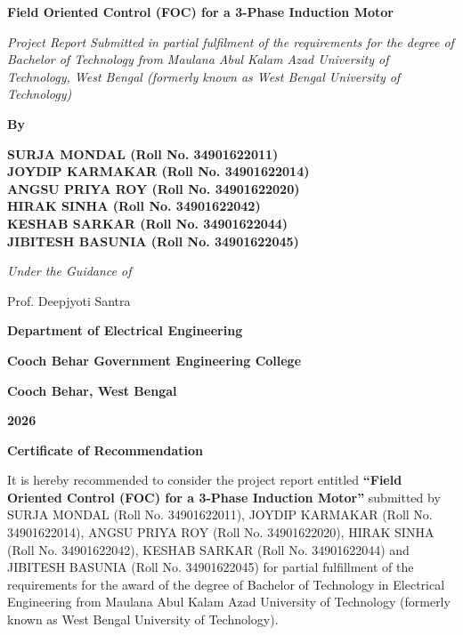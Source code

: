 \documentclass[12pt,a4paper]{report}
\begin{document}
\begin{titlepage}
\begin{center}
{\fontsize{28}{34}\selectfont\bfseries Field Oriented Control (FOC) for a 3-Phase Induction Motor\par}
\vspace{1.5cm}
{\fontsize{14}{17}\selectfont \textit{Project Report Submitted in partial fulfilment of the requirements for the degree of Bachelor of Technology from Maulana Abul Kalam Azad University of Technology, West Bengal (formerly known as West Bengal University of Technology)}\par}
\vspace{1.5cm}
{\Large \bfseries By\par}
\vspace{0.5cm}
{\fontsize{18}{22}\selectfont\bfseries
SURJA MONDAL (Roll No. 34901622011)\\
JOYDIP KARMAKAR (Roll No. 34901622014)\\
ANGSU PRIYA ROY (Roll No. 34901622020)\\
HIRAK SINHA (Roll No. 34901622042)\\
KESHAB SARKAR (Roll No. 34901622044)\\
JIBITESH BASUNIA (Roll No. 34901622045)\par}


\vspace{1.5cm}
{\fontsize{16}{19}\selectfont \textit{Under the Guidance of}\par}
\vspace{0.5cm}
{\fontsize{16}{19}\selectfont Prof. Deepjyoti Santra\par}
\vfill
{\Large \textbf{Department of Electrical Engineering}\par}
{\Large \textbf{Cooch Behar Government Engineering College}\par}
{\Large \textbf{Cooch Behar, West Bengal}\par}
{\Large \textbf{2026}\par}
\end{center}
\end{titlepage}

\newpage
\begin{center}
{\Large \bfseries Certificate of Recommendation\par}
\end{center}
\vspace{1cm}
It is hereby recommended to consider the project report entitled \textbf{``Field Oriented Control (FOC) for a 3-Phase Induction Motor''} submitted by SURJA MONDAL (Roll No. 34901622011), JOYDIP KARMAKAR (Roll No. 34901622014), ANGSU PRIYA ROY (Roll No. 34901622020), HIRAK SINHA (Roll No. 34901622042), KESHAB SARKAR (Roll No. 34901622044) and JIBITESH BASUNIA (Roll No. 34901622045) for partial fulfillment of the requirements for the award of the degree of Bachelor of Technology in Electrical Engineering from Maulana Abul Kalam Azad University of Technology (formerly known as West Bengal University of Technology).
\vspace{3cm}
\end{document}
